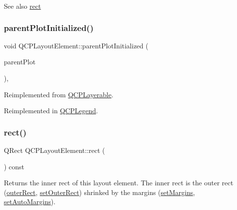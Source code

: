 \begin{DoxySeeAlso}{See also}
\mbox{\hyperlink{class_q_c_p_layout_element_a208effccfe2cca4a0eaf9393e60f2dd4}{rect}} 
\end{DoxySeeAlso}
\mbox{\label{class_q_c_p_layout_element_ab4bb5c5a958451f5f153fdce350f13cf}} 
\subsubsection{\texorpdfstring{parentPlotInitialized()}{parentPlotInitialized()}}
{\footnotesize\ttfamily void Q\+C\+P\+Layout\+Element\+::parent\+Plot\+Initialized (\begin{DoxyParamCaption}\item[{\mbox{\hyperlink{class_q_custom_plot}{Q\+Custom\+Plot}} $\ast$}]{parent\+Plot }\end{DoxyParamCaption})\hspace{0.3cm}{\ttfamily [protected]}, {\ttfamily [virtual]}}



Reimplemented from \mbox{\hyperlink{class_q_c_p_layerable_ab20b7dbd8e0249ed61adb9622c427382}{Q\+C\+P\+Layerable}}.



Reimplemented in \mbox{\hyperlink{class_q_c_p_legend_a2b225cefb5eb267771e2c7c44fd2b408}{Q\+C\+P\+Legend}}.

\mbox{\label{class_q_c_p_layout_element_a208effccfe2cca4a0eaf9393e60f2dd4}} 
\subsubsection{\texorpdfstring{rect()}{rect()}}
{\footnotesize\ttfamily Q\+Rect Q\+C\+P\+Layout\+Element\+::rect (\begin{DoxyParamCaption}{ }\end{DoxyParamCaption}) const\hspace{0.3cm}{\ttfamily [inline]}}

Returns the inner rect of this layout element. The inner rect is the outer rect (\mbox{\hyperlink{class_q_c_p_layout_element_a2a32a12a6161c9dffbadeb9cc585510c}{outer\+Rect}}, \mbox{\hyperlink{class_q_c_p_layout_element_a38975ea13e36de8e53391ce41d94bc0f}{set\+Outer\+Rect}}) shrinked by the margins (\mbox{\hyperlink{class_q_c_p_layout_element_a8f450b1f3f992ad576fce2c63d8b79cf}{set\+Margins}}, \mbox{\hyperlink{class_q_c_p_layout_element_accfda49994e3e6d51ed14504abf9d27d}{set\+Auto\+Margins}}).


